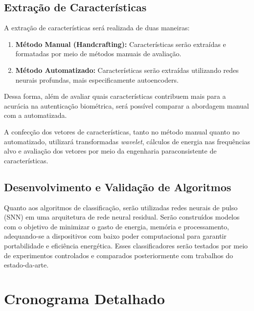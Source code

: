 		\subsection{Extração de Características}
		
			\par A extração de características será realizada de duas maneiras:
			
			\begin{enumerate}
				\item \textbf{Método Manual (Handcrafting):} Características serão extraídas e formatadas por meio de métodos manuais de avaliação.
				\item \textbf{Método Automatizado:} Características serão extraídas utilizando redes neurais profundas, mais especificamente autoencoders.
			\end{enumerate}
			
			\par Dessa forma, além de avaliar quais características contribuem mais para a acurácia na autenticação biométrica, será possível comparar a abordagem manual com a automatizada.
			
			\par A confecção dos vetores de características, tanto no método manual quanto no automatizado, utilizará transformadas \textit{wavelet}, cálculos de energia nas frequências alvo e avaliação dos vetores por meio da engenharia paraconsistente de características.
			
		\subsection{Desenvolvimento e Validação de Algoritmos}
		
			\par Quanto aos algoritmos de classificação, serão utilizadas redes neurais de pulso (SNN) em uma arquitetura de rede neural residual. Serão construídos modelos com o objetivo de minimizar o gasto de energia, memória e processamento, adequando-se a dispositivos com baixo poder computacional para garantir portabilidade e eficiência energética. Esses classificadores serão testados por meio de experimentos controlados e comparados posteriormente com trabalhos do estado-da-arte.
			
			\newpage
	
	\section{Cronograma Detalhado}
	
